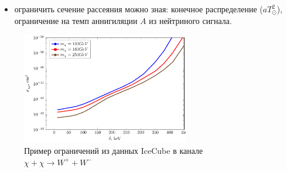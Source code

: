 \begin{itemize}
	\item ограничить сечение рассеяния можно зная: конечное распределение ($aT_{\odot}^2$), ограничение на темп аннигиляции  $A$ из нейтриного сигнала. 
\end{itemize}
\begin{figure}[!h]
	\centering
	\includegraphics[width=0.65\textwidth]{images/Constrains.png}
	\caption{Пример ограничений из данных IceCube в канале $\chi+\chi \to W^{+} + W^{-}$}
\end{figure}